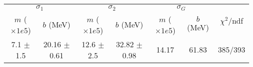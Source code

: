 \begin{tabular}{cc|cc|cc||c}
\multicolumn{2}{c|}{$\sigma_1$} & \multicolumn{2}{|c}{$\sigma_2$} & \multicolumn{2}{|c}{$\sigma_G$}  & \multirow{2}{*}{$\chi^2/$ndf}\\
$m$ ($\times1e5$) & $b$ (MeV) & $m$ ($\times1e5$) & $b$ (MeV) & $m$ ($\times1e5$) & $b$ (MeV) & \\
\hline
7.1 $\pm$ 1.5 & 20.16 $\pm$ 0.61 & 12.6 $\pm$ 2.5 & 32.82 $\pm$ 0.98 & 14.17 & 61.83 & 385/393\\
\end{tabular}
